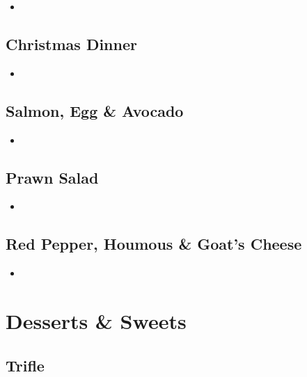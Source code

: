 \documentclass[11pt, english]{article}
\begin{document}
	\begin{itemize}
	\setlength\itemsep{0cm}
		\item 
	\end{itemize}

\newpage

	\subsection{Christmas Dinner}

	\begin{itemize}
	\setlength\itemsep{0cm}
		\item 
	\end{itemize}

\newpage
	
	\subsection{Salmon, Egg \& Avocado}

	\begin{itemize}
	\setlength\itemsep{0cm}
		\item 
	\end{itemize}

\newpage

	\subsection{Prawn Salad}

	\begin{itemize}
	\setlength\itemsep{0cm}
		\item 
	\end{itemize}

\newpage

	\subsection{Red Pepper, Houmous \& Goat's Cheese}

	\begin{itemize}
	\setlength\itemsep{0cm}
		\item 
	\end{itemize}

\newpage

\section{Desserts \& Sweets}

	\subsection{Trifle}
\end{document}
